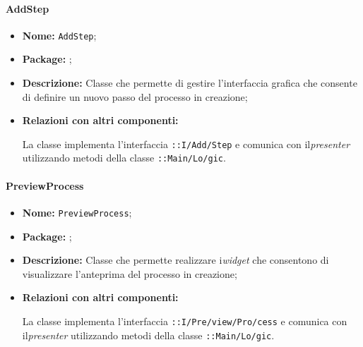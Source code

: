 \paragraph{AddStep}
\begin{flushleft}
\begin{itemize}
\item \textbf{Nome:} \texttt{AddStep};
\item \textbf{Package:} \texttt{\viewAdmin{}};
\item \textbf{Descrizione:} Classe che permette di gestire l'interfaccia grafica che consente di definire un nuovo passo del processo in creazione;
\item \textbf{Relazioni con altri componenti:}
\begin{sloppypar}
La classe implementa l'interfaccia \texttt{\iViewAdmin{}::I\fshyp{}Add\fshyp{}Step} e comunica con il\textit{presenter} utilizzando metodi della classe \texttt{\logicAdmin{}::Main\fshyp{}Lo\fshyp{}gic}.
\end{sloppypar}
\end{itemize}
\end{flushleft}

\paragraph{PreviewProcess}
\begin{flushleft}
\begin{itemize}
\item \textbf{Nome:} \texttt{PreviewProcess};
\item \textbf{Package:} \texttt{\viewAdmin{}};
\item \textbf{Descrizione:} Classe che permette realizzare i\textit{widget} che consentono di visualizzare l'anteprima del processo in creazione;
\item \textbf{Relazioni con altri componenti:}
\begin{sloppypar}
La classe implementa l'interfaccia \texttt{\iViewAdmin{}::I\fshyp{}Pre\fshyp{}view\fshyp{}Pro\fshyp{}cess} e comunica con il\textit{presenter} utilizzando metodi della classe \texttt{\logicAdmin{}::Main\fshyp{}Lo\fshyp{}gic}.
\end{sloppypar}
\end{itemize}
\end{flushleft}

